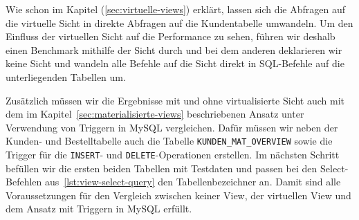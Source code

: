 Wie schon im Kapitel (\ref{sec:virtuelle-views}) erklärt, lassen sich die Abfragen auf die virtuelle Sicht in direkte Abfragen auf die Kundentabelle umwandeln.
Um den Einfluss der virtuellen Sicht auf die Performance zu sehen, führen wir deshalb einen Benchmark mithilfe der Sicht durch und bei dem anderen deklarieren wir keine Sicht und wandeln alle Befehle auf die Sicht direkt in SQL-Befehle auf die unterliegenden Tabellen um.

Zusätzlich müssen wir die Ergebnisse mit und ohne virtualisierte Sicht auch mit dem im Kapitel~\ref{sec:materialisierte-views} beschriebenen Ansatz unter Verwendung von Triggern in MySQL vergleichen.
Dafür müssen wir neben der Kunden- und Bestelltabelle auch die Tabelle \texttt{KUNDEN\_MAT\_OVERVIEW} sowie die Trigger für die \texttt{INSERT}- und \texttt{DELETE}-Operationen erstellen.
Im nächsten Schritt befüllen wir die ersten beiden Tabellen mit Testdaten und passen bei den Select-Befehlen aus~\ref{lst:view-select-query} den Tabellenbezeichner an.
Damit sind alle Voraussetzungen für den Vergleich zwischen keiner View, der virtuellen View und dem Ansatz mit Triggern in MySQL erfüllt.

